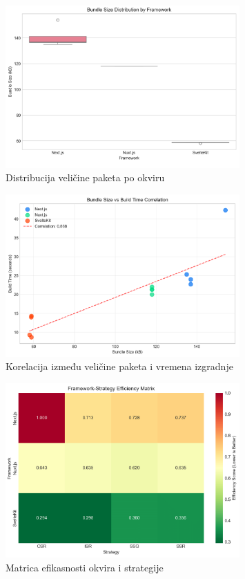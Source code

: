 \begin{figure}[H]
    \centering
    \includegraphics[width=0.8\textwidth]{slike/rezultati/dodatne-metrike/bundle_size_distribution_by_framework.png}
    \caption{Distribucija veličine paketa po okviru}
    \label{fig:bundle_size_distribution_by_framework}
\end{figure}

\begin{figure}[H]
    \centering
    \includegraphics[width=0.8\textwidth]{slike/rezultati/dodatne-metrike/bundle_size_vs_build_time_correlation.png}
    \caption{Korelacija između veličine paketa i vremena izgradnje}
    \label{fig:bundle_size_vs_build_time_correlation}
\end{figure}

\begin{figure}[H]
    \centering
    \includegraphics[width=0.8\textwidth]{slike/rezultati/dodatne-metrike/framework_strategy_efficiency_matrix.png}
    \caption{Matrica efikasnosti okvira i strategije}
    \label{fig:framework_strategy_efficiency_matrix}
\end{figure}

